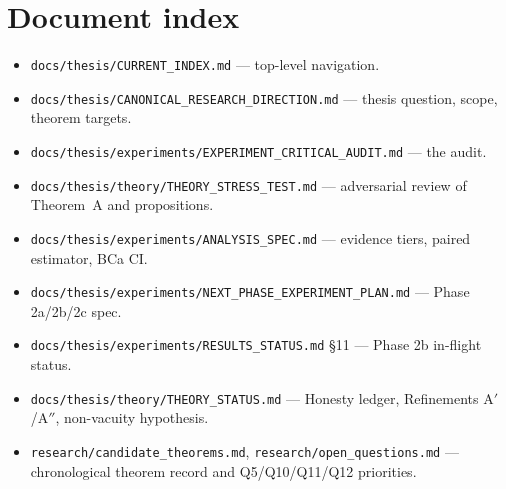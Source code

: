 \documentclass[11pt,a4paper]{article}
\begin{document}
\section{Document index}

\begin{itemize}[leftmargin=1.4em, itemsep=0pt]
  \item \texttt{docs/thesis/CURRENT\_INDEX.md} --- top-level navigation.
  \item \texttt{docs/thesis/CANONICAL\_RESEARCH\_DIRECTION.md} --- thesis question, scope, theorem targets.
  \item \texttt{docs/thesis/experiments/EXPERIMENT\_CRITICAL\_AUDIT.md} --- the audit.
  \item \texttt{docs/thesis/theory/THEORY\_STRESS\_TEST.md} --- adversarial review of Theorem~A and propositions.
  \item \texttt{docs/thesis/experiments/ANALYSIS\_SPEC.md} --- evidence tiers, paired estimator, BCa CI.
  \item \texttt{docs/thesis/experiments/NEXT\_PHASE\_EXPERIMENT\_PLAN.md} --- Phase 2a/2b/2c spec.
  \item \texttt{docs/thesis/experiments/RESULTS\_STATUS.md} \S11 --- Phase 2b in-flight status.
  \item \texttt{docs/thesis/theory/THEORY\_STATUS.md} --- Honesty ledger, Refinements A$'$/A$''$, non-vacuity hypothesis.
  \item \texttt{research/candidate\_theorems.md}, \texttt{research/open\_questions.md} ---
    chronological theorem record and Q5/Q10/Q11/Q12 priorities.
\end{itemize}
\end{document}
